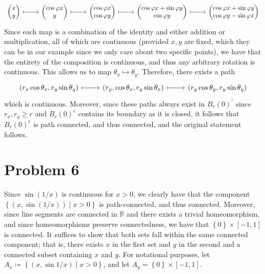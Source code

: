 \documentclass[11pt, letterpaper]{article}
\begin{document}
\[\begin{tikzcd}[row sep = 2.5em, column sep = 2.5em]
\displaystyle{\begin{pmatrix}
x \\
y
\end{pmatrix}}\ar[r, mapsto]&\displaystyle{\begin{pmatrix}
\cos \varphi x \\
y
\end{pmatrix}}\ar[r, mapsto]&\displaystyle{\begin{pmatrix}
\cos \varphi x \\
\cos \varphi y
\end{pmatrix}}\ar[r, mapsto]&\displaystyle{\begin{pmatrix}
\cos \varphi x+\sin \varphi y \\
\cos \varphi y
\end{pmatrix}}\ar[r, mapsto]&\displaystyle{\begin{pmatrix}
\cos \varphi x+\sin \varphi y \\
\cos \varphi y-\sin \varphi x
\end{pmatrix}}
\end{tikzcd}\]
Since each map is a combination of the identity and either addition or multiplication, all of which are continuous (provided $x,y$ are fixed, which they can be in our example since we only care about two specific points), we have that the entirety of the composition is continuous, and thus any arbitrary rotation is continuous. This allows us to map $\theta _x \mapsto \theta _y$. Therefore, there exists a path
\[\begin{tikzcd}[row sep = 2.5em, column sep = 2.5em]
	(r_x \cos \theta _x,r_y \sin \theta _y)\ar[r, mapsto]&(r_y, \cos \theta _x, r_y \sin \theta _x)\ar[r, mapsto]&(r_y \cos \theta _y,r_y \sin \theta _y)
\end{tikzcd}\]
which is continuous. Moreover, since these paths always exist in $B_r(0)^{^{c} } $ since $r_x,r_y \geq r$ and $B_r(0)^{c} $ contains its boundary as it is closed, it follows that $B_r(0)^{c} $ is path connected, and thus connected, and the original statement follows.
\section*{Problem 6}
Since $\sin (1/x)$ is continuous for $x>0$, we clearly have that the component $\left\{ (x,\sin (1/x))\mid x>0 \right\} $ is path-connected, and thus connected. Moreover, since line segments are connected in $\mathbb{R} $ and there exists a trivial homeomorphism, and since homeomorphisms preserve connectedness, we have that $ \left\{ 0 \right\} \times [-1,1]$ is connected. It suffices to show that both sets fall within the same connected component; that is, there exists $x$ in the first set and $y$ in the second and a connected subset containing $x$ and $y$. For notational purposes, let $A_x\coloneqq \left\{ (x,\sin 1/x)\mid x>0 \right\} $, and let $A_y=\left\{ 0 \right\} \times [-1,1]$.
\end{document}
